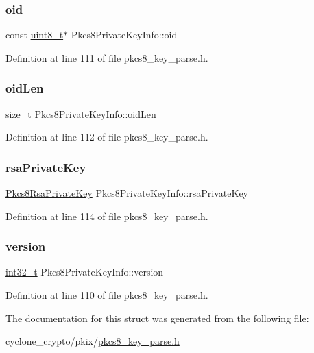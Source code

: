 \subsubsection{\texorpdfstring{oid}{oid}}
{\footnotesize\ttfamily const \hyperlink{stdint_8h_aba7bc1797add20fe3efdf37ced1182c5}{uint8\+\_\+t}$\ast$ Pkcs8\+Private\+Key\+Info\+::oid}



Definition at line 111 of file pkcs8\+\_\+key\+\_\+parse.\+h.

\mbox{\label{structPkcs8PrivateKeyInfo_a77b3088c43e5ad25a5caedcddcb15a2f}} 
\subsubsection{\texorpdfstring{oid\+Len}{oidLen}}
{\footnotesize\ttfamily size\+\_\+t Pkcs8\+Private\+Key\+Info\+::oid\+Len}



Definition at line 112 of file pkcs8\+\_\+key\+\_\+parse.\+h.

\mbox{\label{structPkcs8PrivateKeyInfo_a283526fe608f6a28f2f7fcbd85ef67bb}} 
\subsubsection{\texorpdfstring{rsa\+Private\+Key}{rsaPrivateKey}}
{\footnotesize\ttfamily \hyperlink{structPkcs8RsaPrivateKey}{Pkcs8\+Rsa\+Private\+Key} Pkcs8\+Private\+Key\+Info\+::rsa\+Private\+Key}



Definition at line 114 of file pkcs8\+\_\+key\+\_\+parse.\+h.

\mbox{\label{structPkcs8PrivateKeyInfo_a4a1c74a37ee236610d867fedd0246e78}} 
\subsubsection{\texorpdfstring{version}{version}}
{\footnotesize\ttfamily \hyperlink{stdint_8h_ab1967d8591af1a4e48c37fd2b0f184d0}{int32\+\_\+t} Pkcs8\+Private\+Key\+Info\+::version}



Definition at line 110 of file pkcs8\+\_\+key\+\_\+parse.\+h.



The documentation for this struct was generated from the following file\+:\begin{DoxyCompactItemize}
\item 
cyclone\+\_\+crypto/pkix/\hyperlink{pkcs8__key__parse_8h}{pkcs8\+\_\+key\+\_\+parse.\+h}\end{DoxyCompactItemize}
